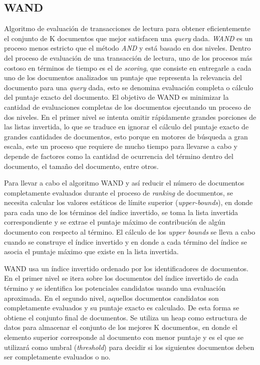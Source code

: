 \subsection{WAND}
\label{marco:wand}
Algoritmo de evaluación de transacciones de lectura para obtener eficientemente el conjunto de K documentos que mejor satisfacen una \textit{query} dada. \textit{WAND} \citep{Broder:2003} es un proceso menos estricto que el método \textit{AND} y está basado en dos niveles. Dentro del proceso de evaluación de una transacción de lectura, uno de los procesos más costoso en términos de tiempo es el de \textit{scoring}, que consiste en entregarle a cada uno de los documentos analizados un puntaje que representa la relevancia del documento para una \textit{query} dada, esto se denomina evaluación completa o cálculo del puntaje exacto del documento. El objetivo de WAND es minimizar la cantidad de evaluaciones completas de los documentos ejecutando un proceso de dos niveles. En el primer nivel se intenta omitir rápidamente grandes porciones de las listas invertida, lo que se traduce en ignorar el cálculo del puntaje exacto de grandes cantidades de documentos, esto porque en motores de búsqueda a gran escala, este un proceso que requiere de mucho tiempo para llevarse a cabo y depende de factores como la cantidad de ocurrencia del término dentro del documento, el tamaño del documento, entre otros.  

Para llevar a cabo el algoritmo WAND y así reducir el número de documentos completamente evaluados durante el proceso de \textit{ranking} de documentos, se necesita calcular los valores estáticos de límite superior (\textit{upper-bounds}), en donde para cada uno de los términos del índice invertido, se toma la lista invertida correspondiente y se extrae el puntaje máximo de contribución de algún documento con respecto al término. El cálculo de los \textit{upper bounds} se lleva a cabo cuando se construye el índice invertido y en donde a cada término del índice se asocia el puntaje máximo que existe en la lista invertida. 

WAND usa un índice invertido ordenado por los identificadores de documentos. En el primer nivel se itera sobre los documentos del índice invertido de cada término y se identifica los potenciales candidatos usando una evaluación aproximada. En el segundo nivel, aquellos documentos candidatos son completamente evaluados y su puntaje exacto es calculado. De esta forma se obtiene el conjunto final de documentos. Se utiliza un heap como estructura de datos para almacenar el conjunto de los mejores K documentos, en donde el elemento superior corresponde al documento con menor puntaje y es el que se utilizará como umbral (\textit{threshold}) para decidir si los siguientes documentos deben ser completamente evaluados o no. 

